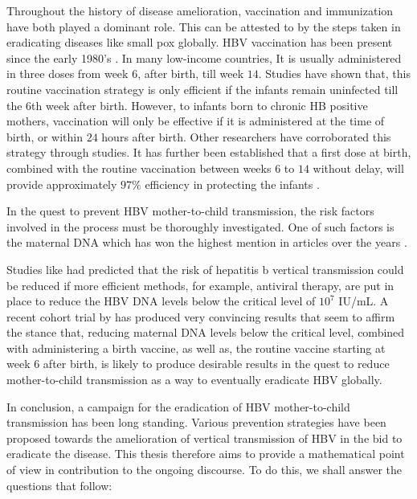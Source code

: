 Throughout the history of disease amelioration, vaccination and immunization have both played a dominant role. This can be attested to by the steps taken in eradicating diseases like small pox globally\cite{fenner1982SmallpoxEradication}. HBV vaccination has been present since the early 1980's \cite{tharmaphornpilas2009increasedRisk}. In many low-income countries, It is usually administered in three doses from week  $6$, after birth, till week $14$. Studies have shown that, this routine vaccination strategy is only efficient if the infants remain uninfected till the $6$th week after birth. However, to infants born to chronic HB positive mothers, vaccination will only be effective if it is administered at the time of birth, or within $24$ hours after birth. Other researchers have corroborated this strategy through studies. It has further been established that a first dose at birth, combined with the routine vaccination between weeks $6$ to $14$ without delay, will provide approximately $97\%$ efficiency in protecting the infants \cite{tharmaphornpilas2009increasedRisk,tran2009management}.

In the quest to prevent HBV mother-to-child transmission, the risk factors involved in the process must be thoroughly investigated. One of such factors is the maternal DNA which has won the highest mention in articles over the years \cite{tran2009management,Pan2012}. 

Studies like \cite{tran2009management,thio2015global} had predicted that the risk of hepatitis b vertical transmission could be reduced if more efficient methods, for example, antiviral therapy, are put in place to reduce the HBV DNA levels below the critical level of $10^7$ IU/mL. A recent cohort trial by \cite{pan2016TenofivirToPrevent} has produced very convincing results that seem to affirm the stance that, reducing maternal DNA levels below the critical level, combined with administering a birth vaccine, as well as, the routine vaccine starting at week 6 after birth, is likely to produce desirable results in the quest to reduce mother-to-child transmission as a way to eventually eradicate HBV globally. 

In conclusion,  a campaign for the eradication of HBV mother-to-child transmission has been long standing. Various prevention strategies have been proposed towards the amelioration of vertical transmission of HBV in the bid to eradicate the disease. This thesis therefore aims to provide a mathematical point of view in contribution to the ongoing discourse. To do this, we shall answer the questions that follow:

